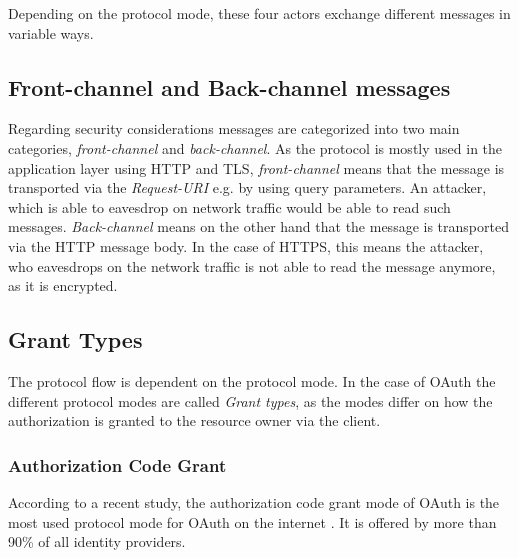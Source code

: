 \documentclass[
    fontsize=12pt,
    headings=small,
    parskip=half,           %
    bibliography=totoc,
    numbers=noenddot,       %
    open=any,               %
    ]{scrreprt}
\begin{document}
Depending on the protocol mode, these four actors exchange different messages in variable ways. 

\subsection{Front-channel and Back-channel messages}

Regarding security considerations messages are categorized into two main categories, \emph{front-channel} and \emph{back-channel}. As the protocol is mostly used in the application layer using HTTP and TLS, \emph{front-channel} means that the message is transported via the \emph{Request-URI} \cite[Sec. 5.1.2]{fielding1999hypertext} e.g. by using query parameters. An attacker, which is able to eavesdrop on network traffic would be able to read such messages.
\emph{Back-channel} means on the other hand that the message is transported via the HTTP message body. In the case of HTTPS, this means the attacker, who eavesdrops on the network traffic is not able to read the message anymore, as it is encrypted. 

\subsection{Grant Types}
The protocol flow is dependent on the protocol mode. In the case of OAuth the different protocol modes are called \emph{Grant types}, as the modes differ on how the authorization is granted to the resource owner via the client.

\subsubsection{Authorization Code Grant}
According to a recent study, the authorization code grant mode of OAuth is the most used protocol mode for OAuth on the internet \cite[Table 1]{philippaerts2022oauch}. It is offered by more than 90\% of all identity providers.
\end{document}
